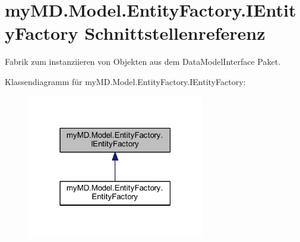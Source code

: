 \hypertarget{interfacemy_m_d_1_1_model_1_1_entity_factory_1_1_i_entity_factory}{}\section{my\+M\+D.\+Model.\+Entity\+Factory.\+I\+Entity\+Factory Schnittstellenreferenz}
\label{interfacemy_m_d_1_1_model_1_1_entity_factory_1_1_i_entity_factory}


Fabrik zum instanziieren von Objekten aus dem Data\+Model\+Interface Paket.  




Klassendiagramm für my\+M\+D.\+Model.\+Entity\+Factory.\+I\+Entity\+Factory\+:
\nopagebreak
\begin{figure}[H]
\begin{center}
\leavevmode
\includegraphics[width=219pt]{interfacemy_m_d_1_1_model_1_1_entity_factory_1_1_i_entity_factory__inherit__graph}
\end{center}
\end{figure}
